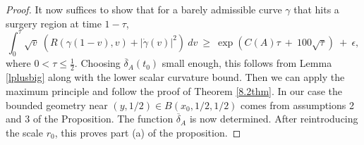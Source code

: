 \documentclass[12pt]{amsart}
\numberwithin{equation}{section}
\theoremstyle{plain}
\theoremstyle{definition}
\theoremstyle{remark}
\begin{document}
\begin{proof}
It now suffices to show that for a barely admissible curve $\gamma$
that hits a surgery region at time $1-\tau$,
\begin{equation}
\int_0^\tau \sqrt{v} \: \left( R(\gamma(1-v), v) + 
|\dot{\gamma}(v)|^2
\right) \: dv \: \ge \: 
\exp(C(A) \tau \: + \: 100 \sqrt{\tau}) \: + \:
\epsilon,
\end{equation}
where $0 < \tau \le \frac12$. Choosing $\overline{\delta}_A(t_0)$ small
enough, this follows from Lemma \ref{lplusbig}
along with the lower scalar curvature bound.
Then we can apply the maximum principle and follow the proof of
Theorem \ref{8.2thm}. In our case the bounded geometry near $(y, 1/2) \in
B(x_0, 1/2, 1/2)$ comes from assumptions 2 and 3 of the
Proposition. The function $\overline{\delta}_A$ is now determined.
After reintroducing the scale $r_0$, 
this proves part (a) of the proposition.


\end{proof}
\end{document}
